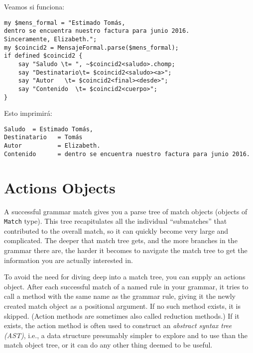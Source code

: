 Veamos si funciona:

\begin{verbatim}
my $mens_formal = "Estimado Tomás,
dentro se encuentra nuestro factura para junio 2016.
Sinceramente, Elizabeth.";
my $coincid2 = MensajeFormal.parse($mens_formal);
if defined $coincid2 { 
    say "Saludo \t= ", ~$coincid2<saludo>.chomp;
    say "Destinatario\t= $coincid2<saludo><a>";
    say "Autor   \t= $coincid2<final><desde>";
    say "Contenido  \t= $coincid2<cuerpo>";
}
\end{verbatim}

Esto imprimirá:

\begin{verbatim}
Saludo 	= Estimado Tomás,
Destinatario   = Tomás
Autor          = Elizabeth.
Contenido      = dentro se encuentra nuestro factura para junio 2016.
\end{verbatim}

\section{Actions Objects}

\label{actions_object}

A successful grammar match gives you a parse tree of 
match objects (objects of \verb'Match' type). This tree 
recapitulates all the individual 
``submatches'' that contributed to the overall match, so 
it can quickly become very large and complicated. 
The deeper that match tree gets, and the more branches in 
the grammar there are, the harder it becomes to navigate the 
match tree to get the information you are actually 
interested in.

To avoid the need for diving deep into a match tree, you 
can supply an actions object. After each successful match 
of a named rule in your grammar, it tries to call a method 
with the same name as the grammar rule, giving it the 
newly created match object as a positional argument. 
If no such method exists, it is skipped. (Action methods 
are sometimes also called reduction methods.) If it exists, 
the action method is often used to construct an \emph{abstract 
syntax tree (AST)}, i.e., a data structure presumably 
simpler to explore and to use than the match object tree, 
or it can do any other thing deemed to be useful.

